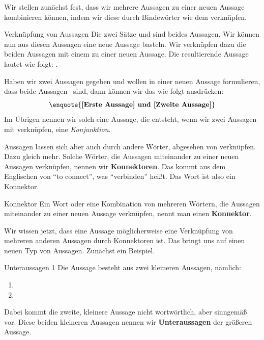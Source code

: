 \documentclass[../../main.tex]{subfiles}
\begin{document}
Wir stellen zunächst fest, dass wir mehrere Aussagen zu einer neuen Aussage kombinieren können, indem wir diese durch Bindewörter wie dem  verknüpfen.
\begin{example}{Verknüpfung von Aussagen}
    Die zwei Sätze
     und 
    sind beides Aussagen. Wir können nun aus diesen Aussagen eine neue Aussage basteln. Wir verknüpfen dazu die beiden Aussagen mit einem  zu einer neuen Aussage. Die resultierende Aussage lautet wie folgt: .
\end{example}
Haben wir zwei Aussagen gegeben und wollen in einer neuen Aussage formulieren, dass
beide Aussagen \wahr\  sind, dann können wir das wie folgt ausdrücken:
\[\textrm{\enquote{\textbf{[Erste Aussage] und [Zweite Aussage]}}}\]
Im Übrigen nennen wir solch eine Aussage, die entsteht, wenn wir zwei Aussagen mit 
verknüpfen, eine \textit{Konjunktion}.

Aussagen lassen sich aber auch durch andere Wörter, abgesehen von  
verknüpfen. Dazu gleich mehr. Solche Wörter, die Aussagen miteinander zu einer 
neuen Aussagen verknüpfen, nennen wir \textbf{Konnektoren}. Das kommt aus dem 
Englischen von \enquote{to connect}, was \enquote{verbinden} heißt. Das Wort  
ist also ein Konnektor.

\begin{definition}{Konnektor}
Ein Wort oder eine Kombination von mehreren Wörtern, die Aussagen miteinander zu einer neuen Aussage verknüpfen, nennt man einen \textbf{Konnektor}.
\end{definition}


Wir wissen jetzt, dass eine Aussage möglicherweise eine Verknüpfung von mehreren
anderen Aussagen durch Konnektoren ist. Das bringt uns auf einen neuen Typ von Aussagen.
Zunächst ein Beispiel.
\begin{example}{Unteraussagen 1}
Die Aussage  besteht aus 
zwei kleineren Aussagen, nämlich:
\begin{enumerate}
    \item {}
    \item {}
\end{enumerate}
Dabei kommt die zweite, kleinere Aussage nicht wortwörtlich, aber sinngemäß vor.
Diese beiden kleineren Aussagen nennen wir \textbf{Unteraussagen} der größeren 
Aussage.
\end{example}
\end{document}
